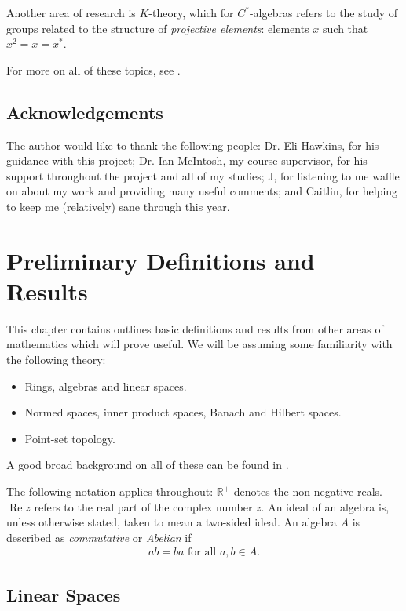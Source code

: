 \documentclass[11pt,a4paper]{report}
\theoremstyle{plain}
\theoremstyle{definition}
\newcommand{\1}{\mathbbm{1}}
\newcommand{\R}{\mathbb{R}}
\DeclareMathOperator{\Real}{\operatorname{Re}}
\begin{document}
Another area of research is $K$-theory, which for $C^\ast$-algebras refers to 
the study of groups related to the structure of \emph{projective elements}:
elements $x$ such that $x^2 = x = x^\ast$.

For more on all of these topics, see \cite{davidson96,dixmier81,sakai71}.

\iftrue
\section*{Acknowledgements}
The author would like to thank the following people: Dr. Eli Hawkins, for his 
guidance with this project; Dr. Ian McIntosh, my course supervisor, for his 
support throughout the project and all of my studies; J, for listening to me 
waffle on about my work and providing many useful comments; and Caitlin, for 
helping to keep me (relatively) sane through this year.
\fi

\chapter{Preliminary Definitions and Results} 
This chapter contains outlines basic definitions and results from other areas
of mathematics which will prove useful.
We will be assuming some familiarity with the following theory:
\begin{itemize}
	\item Rings, algebras and linear spaces.
	\item Normed spaces, inner product spaces, Banach and Hilbert spaces.
	\item Point-set topology.
\end{itemize}
A good broad background on all of these can be found in \cite{rudin91,simmons83}.


	
The following notation applies throughout: $\R^+$ denotes the non-negative 
reals. $\Real z$ refers to the real part of the complex number $z$. An ideal of 
an algebra is, unless otherwise stated, taken to mean a two-sided ideal. An 
algebra $A$ is described as \emph{commutative} or \emph{Abelian} if
\begin{align*}
	ab = ba \mbox{ for all } a,b\in A.
\end{align*}

\section{Linear Spaces}
\end{document}
